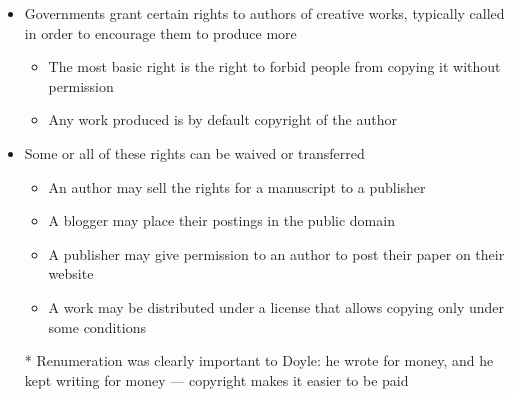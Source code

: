 \documentclass[a4paper,landscape,headrule,footrule,xetex]{foils}
\begin{document}
\begin{itemize}
\item Governments grant certain rights to authors of creative works,
  typically called  in order to encourage them
  to produce more
  \begin{itemize}
  \item The most basic right is the right to forbid people from
    copying it without permission
  \item Any work produced is by default copyright of the author
  \end{itemize}
\item Some or all of these rights can be waived or transferred
  \begin{itemize}
  \item An author may sell the rights for a manuscript to a publisher
  \item A blogger may place their postings in the public domain
  \item A publisher may give permission to an author to post their
    paper on their website
  \item A work may be distributed under a license that allows copying only under some conditions
  \end{itemize}

\item[*]  Renumeration was clearly important to Doyle: he wrote for money, and
  he kept writing for money  --- copyright makes it easier to be paid


\end{itemize}
\end{document}
